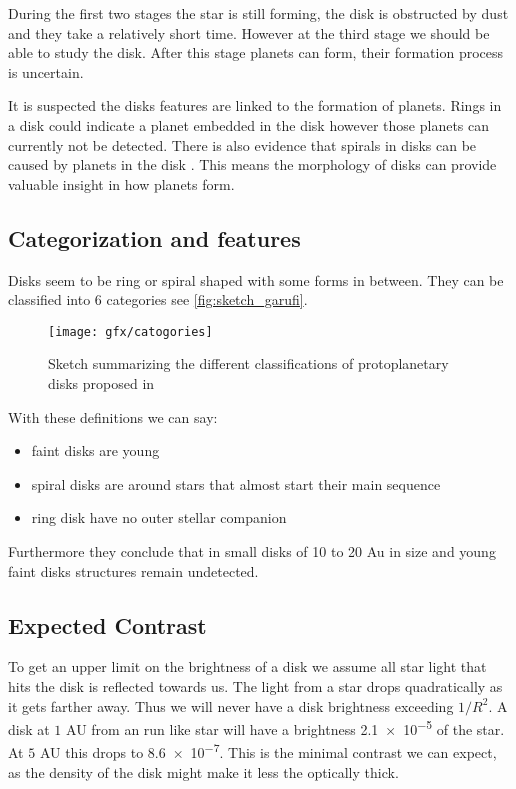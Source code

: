 During the first two stages the star is still forming, the disk is obstructed by dust and they take a relatively short time. However at the third stage we should be able to study the disk. After this stage planets can form, their formation process is uncertain. 

It is suspected the disks features are linked to the formation of planets. Rings in a disk could indicate a planet embedded in the disk \cite{rings} however those planets can currently not be detected. There is also evidence that spirals in disks can be caused by planets in the disk \cite{garufi}. This means the morphology of disks can provide valuable insight in how planets form.

\subsection{Categorization and features}

Disks seem to be ring or spiral shaped with some forms in between. They can be classified into 6 categories \cite{garufi} see \autoref{fig:sketch_garufi}. 

\begin{figure}[H]
    \caption{Sketch summarizing the different classifications of protoplanetary disks proposed in \cite{garufi}}
    \centering
    \texttt{[image: gfx/catogories]}
    \label{fig:sketch_garufi}
\end{figure}

With these definitions we can say: \cite{garufi}
\begin{itemize}
    \item faint disks are young
    \item spiral disks are around stars that almost start their main sequence
    \item ring disk have no outer stellar companion %
\end{itemize}

Furthermore they \cite{garufi} conclude that in small disks of 10 to 20 Au in size and young faint disks structures remain undetected.

\subsection{Expected Contrast}

To get an upper limit on the brightness of a disk we assume all star light that hits the disk is reflected towards us. The light from a star drops quadratically as it gets farther away. Thus we will never have a disk brightness exceeding $1/R^2$. A disk at $1$ AU from an run like star will have a brightness \num{2.1e-5} of the star. At $5$ AU this drops to \num{8.6e-7}. This is the minimal contrast we can expect, as the density of the disk might make it less the optically thick.

